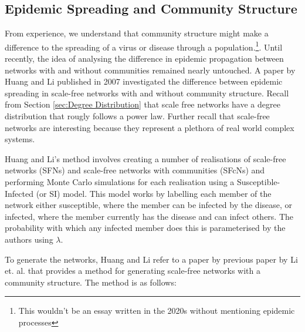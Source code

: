 \subsection{Epidemic Spreading and Community Structure}
From experience, we understand that community structure might make a difference to the spreading of a virus or disease through a population.\footnote{This wouldn't be an essay written in the 2020s without mentioning epidemic processes}. Until recently, the idea of analysing the difference in epidemic propagation between networks with and without communities remained nearly untouched. A paper by Huang and Li published in 2007\cite{Huang_2007} investigated the difference between epidemic spreading in scale-free networks with and without community structure. Recall from Section \ref{sec:Degree Distribution} that scale free networks have a degree distribution that rougly follows a power law. Further recall that scale-free networks are interesting because they represent a plethora of real world complex systems.

Huang and Li's method involves creating a number of realisations of scale-free networks (SFNs) and scale-free networks with communities (SFcNs) and performing Monte Carlo simulations for each realisation using a Susceptible-Infected (or SI) model. This model works by labelling each member of the network either susceptible, where the member can be infected by the disease, or infected, where the member currently has the disease and can infect others. The probability with which any infected member does this is parameterised by the authors using $\lambda$.

To generate the networks, Huang and Li refer to a paper by previous paper by Li et. al.\cite{Li_2005} that provides a method for generating scale-free networks with a community structure. The method is as follows:

